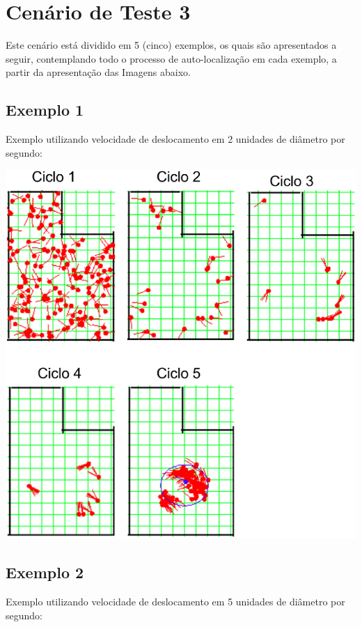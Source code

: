 \section{Cenário de Teste 3}

Este cenário está dividido em 5 (cinco) exemplos, os quais são apresentados a seguir, contemplando todo o processo de auto-localização
em cada exemplo, a partir da apresentação das Imagens abaixo.

\subsection{Exemplo 1}

Exemplo utilizando velocidade de deslocamento em 2 unidades de diâmetro por segundo:

{\centering
\includegraphics[scale=0.4]{figuras/cen3_ex1.eps}
\label{img:cen3_ex1}
\par}


\subsection{Exemplo 2}

Exemplo utilizando velocidade de deslocamento em 5 unidades de diâmetro por segundo:

